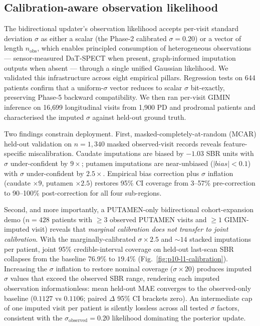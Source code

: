 \subsection{Calibration-aware observation likelihood}
\label{sec:p10-l1}

The bidirectional updater's observation likelihood accepts per-visit standard deviation $\sigma$ as either a scalar (the Phase-2 calibrated $\sigma = 0.20$) or a vector of length $n_\text{obs}$, which enables principled consumption of heterogeneous observations --- sensor-measured DaT-SPECT when present, graph-informed imputation outputs when absent --- through a single unified Gaussian likelihood. We validated this infrastructure across eight empirical pillars. Regression tests on 644 patients confirm that a uniform-$\sigma$ vector reduces to scalar $\sigma$ bit-exactly, preserving Phase-5 backward compatibility. We then ran per-visit GIMIN inference on 16{,}699 longitudinal visits from 1{,}900 PD and prodromal patients and characterised the imputed $\sigma$ against held-out ground truth.

Two findings constrain deployment. First, masked-completely-at-random (MCAR) held-out validation on $n = 1{,}340$ masked observed-visit records reveals feature-specific miscalibration. Caudate imputations are biased by $-1.03$ SBR units with $\sigma$ under-confident by $9\times$; putamen imputations are near-unbiased ($|{bias}| < 0.1$) with $\sigma$ under-confident by $2.5\times$. Empirical bias correction plus $\sigma$ inflation (caudate $\times 9$, putamen $\times 2.5$) restores 95\% CI coverage from 3--57\% pre-correction to 90--100\% post-correction for all four sub-regions.

Second, and more importantly, a PUTAMEN-only bidirectional cohort-expansion demo ($n = 428$ patients with $\geq 3$ observed PUTAMEN visits and $\geq 1$ GIMIN-imputed visit) reveals that \emph{marginal calibration does not transfer to joint calibration}. With the marginally-calibrated $\sigma \times 2.5$ and $\sim 14$ stacked imputations per patient, joint 95\% credible-interval coverage on held-out last-scan SBR collapses from the baseline 76.9\% to $19.4\%$ (Fig.~\ref{fig:p10-l1-calibration}). Increasing the $\sigma$ inflation to restore nominal coverage ($\sigma \times 20$) produces imputed $\sigma$ values that exceed the observed SBR range, rendering each imputed observation informationless: mean held-out MAE converges to the observed-only baseline ($0.1127$ vs $0.1106$; paired $\Delta$ 95\% CI brackets zero). An intermediate cap of one imputed visit per patient is silently lossless across all tested $\sigma$ factors, consistent with the $\sigma_\text{observed} = 0.20$ likelihood dominating the posterior update.

